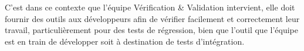 		C'est dans ce contexte que l'équipe Vérification \& Validation intervient, elle doit fournir des outils aux développeurs afin de vérifier facilement et
		correctement leur travail, particulièrement pour des tests de régression, bien que l'outil que l'équipe est en train de développer soit à destination de tests d'intégration.

